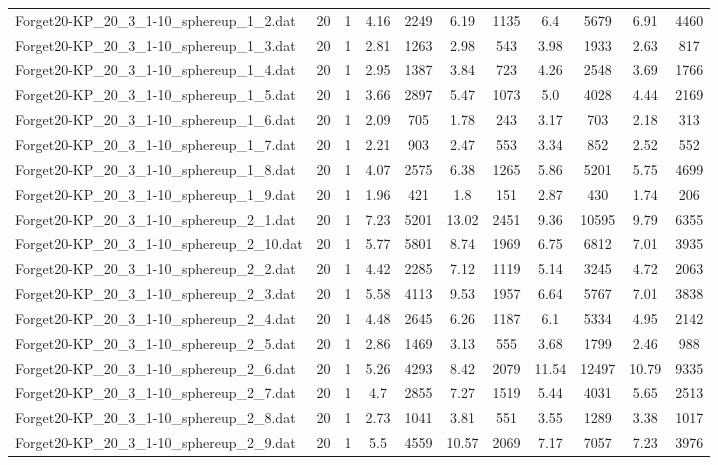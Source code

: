 \begin{table}[!ht]
\begin{tabular}{lcccccccccc}
Forget20-KP\_20\_3\_1-10\_sphereup\_1\_2.dat & 20 & 1 & 4.16 & 2249 & 6.19 & 1135 & 6.4 & 5679 & 6.91 & 4460 \\
Forget20-KP\_20\_3\_1-10\_sphereup\_1\_3.dat & 20 & 1 & 2.81 & 1263 & 2.98 & 543 & 3.98 & 1933 & 2.63 & 817 \\
Forget20-KP\_20\_3\_1-10\_sphereup\_1\_4.dat & 20 & 1 & 2.95 & 1387 & 3.84 & 723 & 4.26 & 2548 & 3.69 & 1766 \\
Forget20-KP\_20\_3\_1-10\_sphereup\_1\_5.dat & 20 & 1 & 3.66 & 2897 & 5.47 & 1073 & 5.0 & 4028 & 4.44 & 2169 \\
Forget20-KP\_20\_3\_1-10\_sphereup\_1\_6.dat & 20 & 1 & 2.09 & 705 & 1.78 & 243 & 3.17 & 703 & 2.18 & 313 \\
Forget20-KP\_20\_3\_1-10\_sphereup\_1\_7.dat & 20 & 1 & 2.21 & 903 & 2.47 & 553 & 3.34 & 852 & 2.52 & 552 \\
Forget20-KP\_20\_3\_1-10\_sphereup\_1\_8.dat & 20 & 1 & 4.07 & 2575 & 6.38 & 1265 & 5.86 & 5201 & 5.75 & 4699 \\
Forget20-KP\_20\_3\_1-10\_sphereup\_1\_9.dat & 20 & 1 & 1.96 & 421 & 1.8 & 151 & 2.87 & 430 & 1.74 & 206 \\
Forget20-KP\_20\_3\_1-10\_sphereup\_2\_1.dat & 20 & 1 & 7.23 & 5201 & 13.02 & 2451 & 9.36 & 10595 & 9.79 & 6355 \\
Forget20-KP\_20\_3\_1-10\_sphereup\_2\_10.dat & 20 & 1 & 5.77 & 5801 & 8.74 & 1969 & 6.75 & 6812 & 7.01 & 3935 \\
Forget20-KP\_20\_3\_1-10\_sphereup\_2\_2.dat & 20 & 1 & 4.42 & 2285 & 7.12 & 1119 & 5.14 & 3245 & 4.72 & 2063 \\
Forget20-KP\_20\_3\_1-10\_sphereup\_2\_3.dat & 20 & 1 & 5.58 & 4113 & 9.53 & 1957 & 6.64 & 5767 & 7.01 & 3838 \\
Forget20-KP\_20\_3\_1-10\_sphereup\_2\_4.dat & 20 & 1 & 4.48 & 2645 & 6.26 & 1187 & 6.1 & 5334 & 4.95 & 2142 \\
Forget20-KP\_20\_3\_1-10\_sphereup\_2\_5.dat & 20 & 1 & 2.86 & 1469 & 3.13 & 555 & 3.68 & 1799 & 2.46 & 988 \\
Forget20-KP\_20\_3\_1-10\_sphereup\_2\_6.dat & 20 & 1 & 5.26 & 4293 & 8.42 & 2079 & 11.54 & 12497 & 10.79 & 9335 \\
Forget20-KP\_20\_3\_1-10\_sphereup\_2\_7.dat & 20 & 1 & 4.7 & 2855 & 7.27 & 1519 & 5.44 & 4031 & 5.65 & 2513 \\
Forget20-KP\_20\_3\_1-10\_sphereup\_2\_8.dat & 20 & 1 & 2.73 & 1041 & 3.81 & 551 & 3.55 & 1289 & 3.38 & 1017 \\
Forget20-KP\_20\_3\_1-10\_sphereup\_2\_9.dat & 20 & 1 & 5.5 & 4559 & 10.57 & 2069 & 7.17 & 7057 & 7.23 & 3976 \\

\end{tabular}
\end{table}
